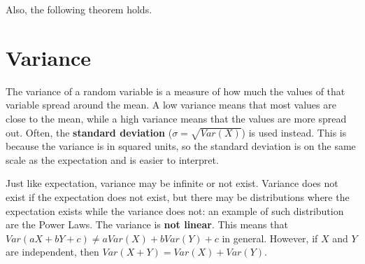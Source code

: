 Also, the following theorem holds.

\section{Variance}
The variance of a random variable is a measure of how much the values of that variable spread around the mean. A low variance means that most values are close to the mean, while a high variance means that the values are more spread out.
Often, the \textbf{standard deviation} ($\sigma = \sqrt{Var(X)}$) is used instead. This is because the variance is in squared units, so the standard deviation is on the same scale as the expectation and is easier to interpret.

Just like expectation, variance may be infinite or not exist. Variance does not exist if the expectation does not exist, but there may be distributions where the expectation exists while the variance does not: an example of such distribution are the Power Laws.
The variance is \textbf{not linear}. This means that $Var(aX + bY + c) \neq aVar(X) + bVar(Y) + c$ in general. However, if $X$ and $Y$ are independent, then $Var(X + Y) = Var(X) + Var(Y)$.


